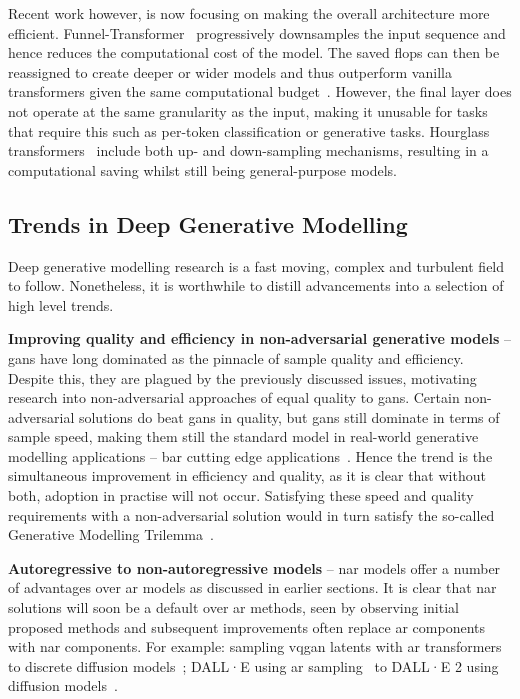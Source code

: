 Recent work however, is now focusing on making the overall architecture more
efficient. Funnel-Transformer~\cite{dai2020funneltransformer} progressively
downsamples the input sequence and hence reduces the computational cost of the
model. The saved \glspl{flop} can then be reassigned to create deeper or wider models
and thus outperform vanilla transformers given the same computational
budget~\cite{dai2020funneltransformer}. However, the final layer does not
operate at the same granularity as the input, making it unusable for tasks that
require this such as per-token classification or generative tasks. Hourglass
transformers~\cite{nawrot2021hierarchical} include both up- and down-sampling
mechanisms, resulting in a computational saving whilst still being
general-purpose models.

\subsection{Trends in Deep Generative Modelling}
\label{subsec:trends}

Deep generative modelling research is a fast moving, complex and turbulent field
to follow. Nonetheless, it is worthwhile to distill advancements into a
selection of high level trends.

\textbf{Improving quality and efficiency in non-adversarial generative models} -- 
\glspl{gan} have long dominated as the pinnacle of sample quality and
efficiency. Despite this, they are plagued by the previously discussed issues,
motivating research into non-adversarial approaches of equal quality to
\glspl{gan}. Certain non-adversarial solutions do beat \glspl{gan} in quality,
but \glspl{gan} still dominate in terms of sample speed, making them still the
standard model in real-world generative modelling applications -- bar cutting
edge applications~\cite{ramesh2021dalle,ramesh2022dalle2}. Hence the trend is
the simultaneous improvement in efficiency and quality, as it is clear that
without both, adoption in practise will not occur. Satisfying these speed and
quality requirements with a non-adversarial solution would in turn satisfy the
so-called Generative Modelling Trilemma~\cite{xiao2021trilemma}.

\textbf{Autoregressive to non-autoregressive models} -- 
\Gls{nar} models offer a number of advantages over \gls{ar} models as discussed
in earlier sections. It is clear that \gls{nar} solutions will soon be a default
over \gls{ar} methods, seen by observing initial proposed methods and
subsequent improvements often replace \gls{ar} components with \gls{nar}
components. For example: sampling \gls{vqgan} latents with \gls{ar}
transformers~\cite{esser2021taming} to discrete diffusion
models~\cite{bondtaylor2021unleashing}; DALL·E using \gls{ar}
sampling~\cite{ramesh2021dalle} to DALL·E 2 using diffusion
models~\cite{ramesh2022dalle2}.

